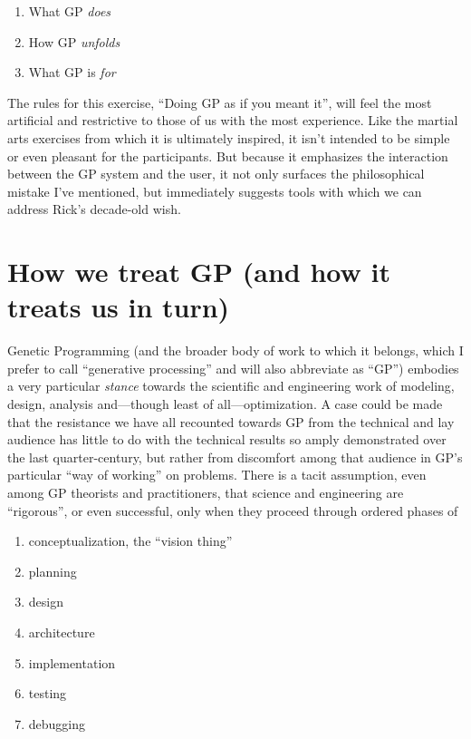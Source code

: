 \begin{enumerate}
\item What GP \emph{does}
\item How GP \emph{unfolds}
\item What GP is \emph{for}
\end{enumerate}

The rules for this exercise, ``Doing GP as if you meant it'', will feel the most artificial and restrictive to those of us with the most experience. Like the martial arts exercises from which it is ultimately inspired, it isn't intended to be simple or even pleasant for the participants. But because it emphasizes the interaction between the GP system and the user, it not only surfaces the philosophical mistake I've mentioned, but immediately suggests tools with which we can address Rick's decade-old wish.

\section{How we treat GP (and how it treats us in turn)}\hypertarget{how-we-treat-gp-and-how-it-treats-us-in-turn}{}\label{how-we-treat-gp-and-how-it-treats-us-in-turn}

Genetic Programming (and the broader body of work to which it belongs, which I prefer to call ``generative processing'' and will also abbreviate as ``GP'') embodies a very particular \emph{stance} towards the scientific and engineering work of modeling, design, analysis and---though least of all---optimization. A case could be made that the resistance we have all recounted towards GP from the technical and lay audience has little to do with the technical results so amply demonstrated over the last quarter-century, but rather from discomfort among that audience in GP's particular ``way of working'' on problems. There is a tacit assumption, even among GP theorists and practitioners, that science and engineering are ``rigorous'', or even successful, only when they proceed through ordered phases of

\begin{enumerate}
\item conceptualization, the ``vision thing''
\item planning
\item design
\item architecture
\item implementation
\item testing
\item debugging
\end{enumerate}

